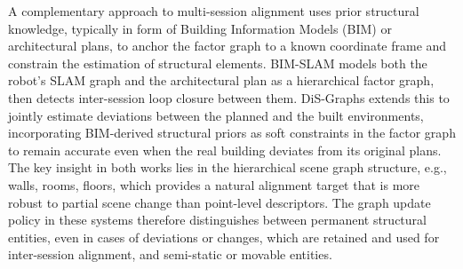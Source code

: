 A complementary approach to multi-session alignment uses prior structural knowledge, typically in form of Building Information Models (BIM) or architectural plans, to anchor the factor graph to a known coordinate frame and constrain the estimation of structural elements. 
BIM-SLAM \cite{vega_torres_bim-slam_2023} models both the robot's SLAM graph and the architectural plan as a hierarchical factor graph, then detects inter-session loop closure between them. 
DiS-Graphs \cite{shaheer_tightly_2025} extends this to jointly estimate deviations between the planned and the built environments, incorporating BIM-derived structural priors as soft constraints in the factor graph to remain accurate even when the real building deviates from its original plans.
The key insight in both works lies in the hierarchical scene graph structure, e.g., walls, rooms, floors, which provides a natural alignment target that is more robust to partial scene change than point-level descriptors.
The graph update policy in these systems therefore distinguishes between permanent structural entities, even in cases of deviations or changes, which are retained and used for inter-session alignment, and semi-static or movable entities.
